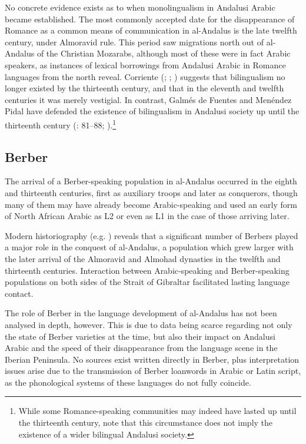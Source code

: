 \documentclass[output=paper,modfonts,nonflat]{langsci/langscibook}
\begin{document}
No concrete evidence exists as to when monolingualism in Andalusi Arabic became established. The most commonly accepted date for the disappearance of Romance as a common means of communication in al-Andalus is the late twelfth century, under Almoravid rule. This period saw migrations north out of al-Andalus of the Christian Mozarabs, although most of these were in fact Arabic speakers, as instances of lexical borrowings from Andalusi Arabic in Romance languages from the north reveal. Corriente (\citeyear{Corriente1997dictionary}; \citeyear[443]{Corriente1992book}; \citeyear{Corriente2005}) suggests that bilingualism no longer existed by the thirteenth century, and that in the eleventh and twelfth centuries it was merely vestigial. In contrast, Galmés de Fuentes and Menéndez Pidal have defended the existence of bilingualism in Andalusi society up until the thirteenth century (\citealt{GalmésdeFuentes1994}: 81–88; \citealt{MenéndezPidalGalmésdeFuentes2001}).\footnote{While some Romance-speaking communities may indeed have lasted up until the thirteenth century, note that this circumstance does not imply the existence of a wider bilingual Andalusi society.} 

\subsection{Berber}

The arrival of a Berber-speaking population in al-Andalus occurred in the eighth and thirteenth centuries, first as auxiliary troops and later as conquerors, though many of them may have already become Arabic-speaking and used an early form of North African Arabic as L2 or even as L1 in the case of those arriving later. 

Modern historiography (e.g. \citealt{ManzanoMoreno1990,Guichard1995,Chalmeta2003}) reveals that a significant number of Berbers played a major role in the conquest of al-Andalus, a population which grew larger with the later arrival of the Almoravid and Almohad dynasties in the twelfth and thirteenth centuries. Interaction between Arabic-speaking and Berber-speaking populations on both sides of the Strait of Gibraltar facilitated lasting language contact. 

The role of Berber in the language development of al-Andalus has not been analysed in depth, however. This is due to data being scarce regarding not only the state of Berber varieties at the time, but also their impact on Andalusi Arabic and the speed of their disappearance from the language scene in the Iberian Peninsula. No sources exist written directly in Berber, plus interpretation issues arise due to the transmission of Berber loanwords in Arabic or Latin script, as the phonological systems of these languages do not fully coincide.  
\end{document}
